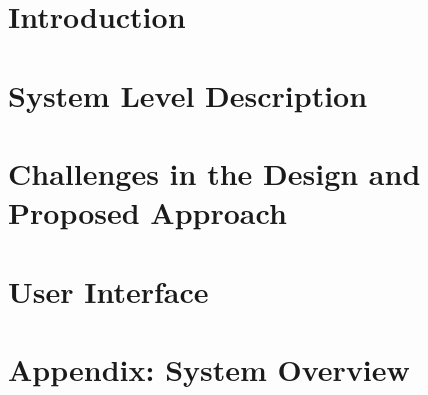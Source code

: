 

\chapter{Introduction}\label{ch:introduction}
\setcounter{page}{1}


\chapter{System Level Description}\label{ch:description}


\chapter{Challenges in the Design and Proposed Approach}\label{ch:challenges}


\chapter{User Interface}\label{ch:UI}


\appendix
\chapter{Appendix: System Overview}\label{app:overview}

